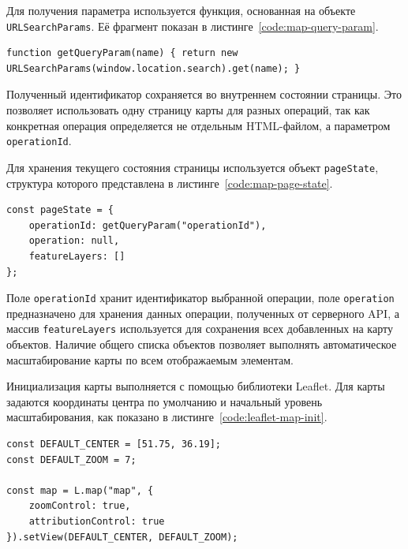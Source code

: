 Для получения параметра используется функция, основанная на объекте \texttt{URLSearchParams}. Её фрагмент показан в листинге~\ref{code:map-query-param}.

\begin{code}
\label{code:map-query-param}
\vspace{-0.75cm}
\begin{verbatim}
function getQueryParam(name) { return new URLSearchParams(window.location.search).get(name); }
\end{verbatim}
\end{code}

Полученный идентификатор сохраняется во внутреннем состоянии страницы. Это позволяет использовать одну страницу карты для разных операций, так как конкретная операция определяется не отдельным HTML-файлом, а параметром \texttt{operationId}.

Для хранения текущего состояния страницы используется объект \texttt{pageState}, структура которого представлена в листинге~\ref{code:map-page-state}.

\begin{code}
\label{code:map-page-state}
\vspace{-0.75cm}
\begin{verbatim}
const pageState = {
    operationId: getQueryParam("operationId"),
    operation: null,
    featureLayers: []
};
\end{verbatim}
\end{code}

Поле \texttt{operationId} хранит идентификатор выбранной операции, поле \texttt{operation} предназначено для хранения данных операции, полученных от серверного API, а массив \texttt{featureLayers} используется для сохранения всех добавленных на карту объектов. Наличие общего списка объектов позволяет выполнять автоматическое масштабирование карты по всем отображаемым элементам.

Инициализация карты выполняется с помощью библиотеки Leaflet. Для карты задаются координаты центра по умолчанию и начальный уровень масштабирования, как показано в листинге~\ref{code:leaflet-map-init}.

\begin{code}
\label{code:leaflet-map-init}
\vspace{-0.75cm}
\begin{verbatim}
const DEFAULT_CENTER = [51.75, 36.19];
const DEFAULT_ZOOM = 7;

const map = L.map("map", {
    zoomControl: true,
    attributionControl: true
}).setView(DEFAULT_CENTER, DEFAULT_ZOOM);
\end{verbatim}
\end{code}

